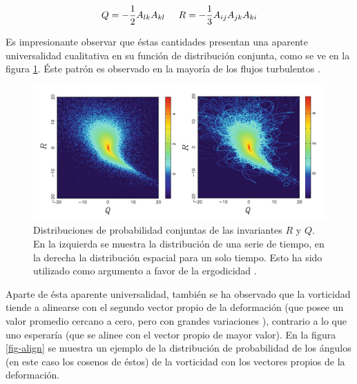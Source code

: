 \documentclass[executivepaper,12pt]{article}
\numberwithin{equation}{section}
\begin{document}
\begin{equation}
	Q=-\frac{1}{2}A_{lk}A_{kl}\hspace{0.5cm} R=-\frac{1}{3}A_{ij}A_{jk}A_{ki}
\end{equation}

Es impresionante observar que éstas cantidades presentan una aparente universalidad cualitativa en su función de distribución conjunta, como se ve en la figura \ref{fig-tearDrop}. Éste patrón es observado en la mayoría de los flujos turbulentos \parencite{tsinober2019}. 

\begin{figure}[H]
	\begin{center}
		\includegraphics[scale=0.60]{tearDrop}
	\end{center}
	\caption{Distribuciones de probabilidad conjuntas de las invariantes $R$ y $Q$. En la izquierda se muestra la distribución de una serie de tiempo, en la derecha la distribución espacial para un solo tiempo. Esto ha sido utilizado como argumento a favor de la ergodicidad \parencite{galanti2000}.}
	\label{fig-tearDrop}
\end{figure}

Aparte de ésta aparente universalidad, también se ha observado que la vorticidad tiende a  alinearse con el segundo vector propio de la deformación \parencite{elsinga2010} (que posee un valor promedio cercano a cero, pero con grandes variaciones \parencite{hamlington2008}), contrario a lo que uno esperaría (que se alinee con el vector propio de mayor valor). En la figura \ref{fig-align} se muestra un ejemplo de la distribución de probabilidad de los ángulos (en este caso los cosenos de éstos) de la vorticidad con los vectores propios de la deformación.  
\end{document}
